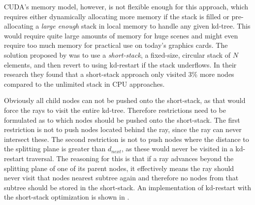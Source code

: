 CUDA's memory model, however, is not flexible enough for this approach, which
requires either dynamically allocating more memory if the stack is filled or
pre-allocating a \textit{large enough} stack in local memory to handle any given
kd-tree. This would require quite large amounts of memory for huge scenes and
might even require too much memory for practical use on today's graphics
cards. The solution proposed by \horn{} was to use a \textit{short-stack}, a
fixed-size, circular stack of $N$ elements, and then revert to using kd-restart
if the stack underflows. In their research they found that a short-stack
approach only visited 3\% more nodes compared to the unlimited stack in CPU
approaches.


Obviously all child nodes can not be pushed onto the short-stack, as that would
force the rays to visit the entire kd-tree. Therefore restrictions need to be
formulated as to which nodes should be pushed onto the short-stack. The first
restriction is not to push nodes located behind the ray, since the ray can never
intersect these. The second restriction is not to push nodes where the distance
to the splitting plane is greater than $d_{next}$, as these would never be
visited in a kd-restart traversal. The reasoning for this is that if a ray
advances beyond the splitting plane of one of its parent nodes, it effectively
means the ray should never visit that nodes nearest subtree again and therefore
no nodes from that subtree should be stored in the short-stack. An
implementation of kd-restart with the short-stack optimization is shown in
.

